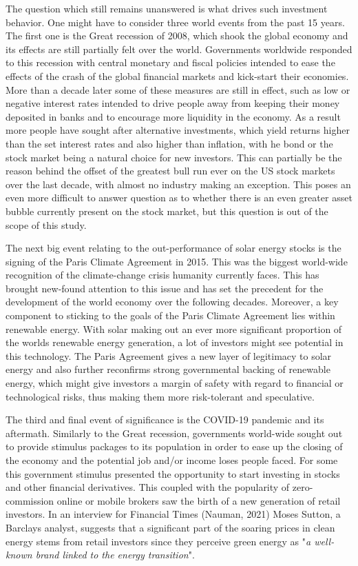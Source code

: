 \documentclass[11pt]{article}
\begin{document}
The question which still remains unanswered is what drives such investment behavior. One might have to consider three world events from the past 15 years. The first one is the Great recession of 2008, which shook the global economy and its effects are still partially felt over the world. Governments worldwide responded to this recession with central monetary and fiscal policies intended to ease the effects of the crash of the global financial markets and kick-start their economies. More than a decade later some of these measures are still in effect, such as low or negative interest rates intended to drive people away from keeping their money deposited in banks and to encourage more liquidity in the economy. As a result more people have sought after alternative investments, which yield returns higher than the set interest rates and also higher than inflation, with he bond or the stock market being a natural choice for new investors. This can partially be the reason behind the offset of the greatest bull run ever on the US stock markets over the last decade, with almost no industry making an exception. This poses an even more difficult to answer question as to whether there is an even greater asset bubble currently present on the stock market, but this question is out of the scope of this study.
\newline

The next big event relating to the out-performance of solar energy stocks is the signing of the Paris Climate Agreement in 2015. This was the biggest world-wide recognition of the climate-change crisis humanity currently faces. This has brought new-found attention to this issue and has set the precedent for the development of the world economy over the following decades. Moreover, a key component to sticking to the goals of the Paris Climate Agreement lies within renewable energy. With solar making out an ever more significant proportion of the worlds renewable energy generation, a lot of investors might see potential in this technology. The Paris Agreement gives a new layer of legitimacy to solar energy and also further reconfirms strong governmental backing of renewable energy, which might give investors a margin of safety with regard to financial or technological risks, thus making them more risk-tolerant and speculative. 
\newline

The third and final event of significance is the COVID-19 pandemic and its aftermath. Similarly to the Great recession, governments world-wide sought out to provide stimulus packages to its population in order to ease up the closing of the economy and the potential job and/or income loses people faced. For some this government stimulus presented the opportunity to start investing in stocks and other financial derivatives. This coupled with the popularity of zero-commission online or mobile brokers saw the birth of a new generation of retail investors. In an interview for Financial Times (Nauman, 2021) Moses Sutton, a Barclays analyst, suggests that a significant part of the soaring prices in clean energy stems from retail investors since they perceive green energy as "\textit{a well-known brand linked to the energy transition}".
\newline
\end{document}
